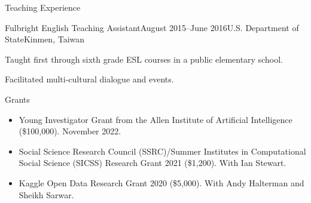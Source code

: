 \documentclass{resume} %
\begin{document}
\begin{rSection}{Teaching Experience}
\begin{rSubsection}{Fulbright English Teaching Assistant}{August 2015--June 2016}{U.S. Department of State}{Kinmen, Taiwan}
\item Taught first through sixth grade ESL courses in a public elementary school.
\item Facilitated multi-cultural dialogue and events.
\end{rSubsection}


\end{rSection}





\begin{rSection}{Grants}
\begin{itemize}
\item Young Investigator Grant from the Allen Institute of Artificial Intelligence (\$100,000). November 2022. 
\item  Social Science Research Council (SSRC)/Summer Institutes in Computational Social Science (SICSS) Research Grant 2021 (\$1,200). With Ian Stewart. 
\item  Kaggle Open Data Research Grant 2020 (\$5,000). With Andy Halterman and Sheikh Sarwar.
\end{itemize}

\end{rSection}
\end{document}

